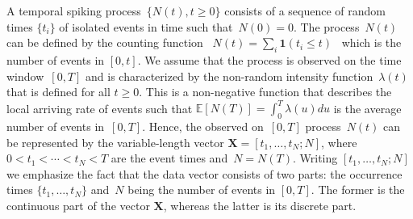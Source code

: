 \documentclass[lettersize,journal,onecolumn]{IEEEtran}
\theoremstyle{definition}
\newcommand{\E}[1]{\mathbb{E}\left[#1\right]}
\newcommand{\indicator}[1]{{\mathbf{1}}\left( #1 \right)}
\begin{document}
\noindent A temporal spiking process~\mbox{$\{N(t),t\geq0\}$} consists of a sequence 
of random times $\{t_{i}\}$ of isolated events in time such that~\mbox{$N(0)=0$}. The 
process~$N(t)$ can be defined by the counting function \mbox{
	$N(t)=\sum_i \indicator{t_i \leq t}$
} which is the number of events in \mbox{$\left[0,t\right]$}. 
We assume that the process is observed on 
the time window~$[0,T]$ and is characterized by the non-random intensity 
function~$\lambda(t)$ that is defined for all $t\geq0$. 
This is a non-negative function that describes the local 
arriving rate of events such that \mbox{$\E{N(T)}=\int_{0}^{T}\lambda(u)du$} 
is the average number of events in~$[0,T]$. Hence, the observed on~$[0,T]$ 
process~$N(t)$ can be represented by the variable-length vector 
\mbox{$\mathbf{X}=[t_{1},\ldots,t_{N};N]$}, where \mbox{$0<t_{1}<\cdots<t_{N}<T$} are 
the event times and~\mbox{$N=N(T)$}. Writing $\left[t_1,\ldots,t_N;N\right]$ we 
emphasize the fact that the data vector consists of two parts: the occurrence times 
\mbox{$\lbrace t_1,\ldots,t_N \rbrace$} and~$N$ being the number of events in 
\mbox{$\left[0,T\right]$}. The former is the continuous part of the vector 
$\mathbf{X}$, whereas the latter is its discrete part.
\end{document}
